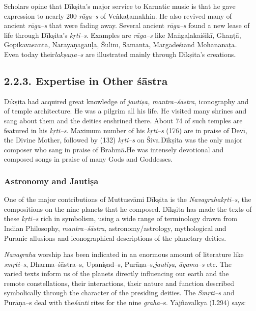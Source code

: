 Scholars opine that Dīkṣita’s major service to Karnatic music is that he gave expression to nearly 200 \textit{rāga–s} of Veṅkaṭamakhin. He also revived many of ancient \textit{rāga–s} that were fading away. Several ancient \textit{rāga–s} found a new lease of life through Dīkṣita’s \textit{kṛti–s}. Examples are \textit{rāga–s} like Maṅgaḷakaiśikī, Ghaṇṭā, Gopikāvasanta, Nārāyaṇagauḷa, Śūlinī, Sāmanta, Mārgadeśīand Mohananāṭa\textit{. }Even today their\break \textit{lakṣaṇa–s} are illustrated mainly through Dīkṣita’s creations.


\subsection*{2.2.3. Expertise in Other śāstra}

Dīkṣita had acquired great knowledge of \textit{jautiṣa, mantra–śāstra}, iconography and of temple architecture. He was a pilgrim all his life. He visited many shrines and sang about them and the deities enshrined there. About 74 of such temples are featured in his \textit{kṛti–s}. Maximum number of his \textit{kṛti–s} (176) are in praise of Devī, the Divine Mother, followed by (132) \textit{kṛti–s} on Śiva.Dīkṣita was the only major composer who sang in praise of Brahmā\textbf{.}He was intensely devotional and composed songs in praise of many Gods and Goddesses.

\subsubsection*{Astronomy and Jautiṣa}

One of the major contributions of Muttusvāmi Dīkṣita is the \textit{Navagrahakṛti}–\textit{s}, the compositions on the nine planets that he composed. Dīkṣita has made the texts of these \textit{kṛti–s} rich in symbolism, using a wide range of terminology drawn from Indian Philosophy, \textit{mantra–śāstra}, astronomy/astrology, mythological and Puranic allusions and iconographical descriptions of the planetary deities.

\textit{Navagraha} worship has been indicated in an enormous amount of literature like \textit{smṛti–s}, Dharma–śāstra–s, Upaniṣad–s, Purāṇa–s,\break \textit{jautiṣa}, \textit{āgama–s} etc. The varied texts inform us of the planets directly influencing our earth and the remote constellations, their interactions, their nature and function described symbolically through the character of the presiding deities. The \textit{Smṛti–s} and Purāṇa–s deal with the\textit{śānti} rites for the nine \textit{graha}–s. Yājñavalkya (I.294) says:

